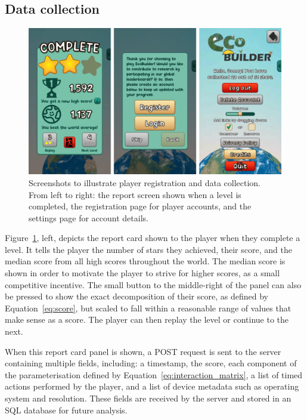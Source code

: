 \subsection{Data collection}

\begin{figure}
    \centering
    \includegraphics[width=\textwidth]{joy/server.png}
    \caption[Player registration and data collection]{Screenshots to illustrate player registration and data collection. From left to right: the report screen shown when a level is completed, the registration page for player accounts, and the settings page for account details.}
    \label{fig:eco_server}
\end{figure}

Figure~\ref{fig:eco_server}, left, depicts the report card shown to the player when they complete a level. It tells the player the number of stars they achieved, their score, and the median score from all high scores throughout the world. The median score is shown in order to motivate the player to strive for higher scores, as a small competitive incentive.
The small button to the middle-right of the panel can also be pressed to show the exact decomposition of their score, as defined by Equation~\ref{eq:score}, but scaled to fall within a reasonable range of values that make sense as a score. The player can then replay the level or continue to the next.

When this report card panel is shown, a POST request is sent to the server containing multiple fields, including: a timestamp, the score, each component of the parameterisation defined by Equation~\ref{eq:interaction_matrix}, a list of timed actions performed by the player, and a list of device metadata such as operating system and resolution.
These fields are received by the server and stored in an SQL database for future analysis.

